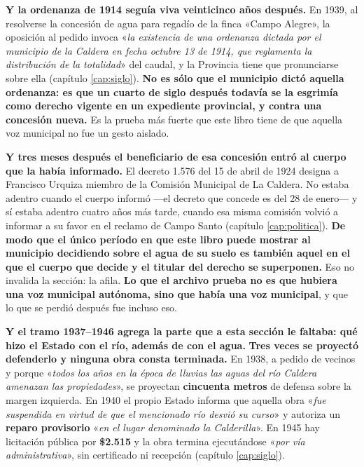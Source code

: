 \begin{cautela}
\textbf{Y la ordenanza de 1914 seguía viva veinticinco años después.} En 1939, al
resolverse la concesión de agua para regadío de la finca «Campo Alegre», la
oposición al pedido invoca «\textit{la existencia de una ordenanza dictada por el
municipio de la Caldera en fecha octubre 13 de 1914, que reglamenta la
distribución de la totalidad}» del caudal, y la Provincia tiene que pronunciarse
sobre ella (capítulo \ref{cap:siglo}). \textbf{No es sólo que el municipio
dictó aquella ordenanza: es que un cuarto de siglo después todavía se la
esgrimía como derecho vigente en un expediente provincial, y contra una
concesión nueva.} Es la prueba más fuerte que este libro tiene de que aquella
voz municipal no fue un gesto aislado.

\textbf{Y tres meses después el beneficiario de esa concesión entró al cuerpo que la había
informado.} El decreto 1.576 del 15 de abril de 1924 designa a Francisco Urquiza
miembro de la Comisión Municipal de La Caldera. No estaba adentro cuando el cuerpo informó ---el
decreto que concede es del 28 de enero--- y sí estaba adentro cuatro años más tarde, cuando esa
misma comisión volvió a informar a su favor en el reclamo de Campo Santo (capítulo
\ref{cap:politica}). \textbf{De modo que el único período en que este libro puede mostrar al
municipio decidiendo sobre el agua de su suelo es también aquel en el que el cuerpo que decide y
el titular del derecho se superponen.} Eso no invalida la sección: la afila. \textbf{Lo que el
archivo prueba no es que hubiera una voz municipal autónoma, sino que había una voz municipal}, y
que lo que se perdió después fue incluso eso.

\begin{cautela}
\textbf{Y el tramo 1937--1946 agrega la parte que a esta sección le faltaba: qué hizo el Estado
con el río, además de con el agua.} \textbf{Tres veces se proyectó defenderlo y ninguna obra
consta terminada.} En 1938, a pedido de vecinos y porque «\textit{todos los años en la época de
lluvias las aguas del río Caldera amenazan las propiedades}», se proyectan \textbf{cincuenta
metros} de defensa sobre la margen izquierda. En 1940 el propio Estado informa que aquella obra
«\textit{fue suspendida en virtud de que el mencionado río desvió su curso}» y autoriza un
\textbf{reparo provisorio} «\textit{en el lugar denominado la Calderilla}». En 1945 hay
licitación pública por \textbf{\$2.515} y la obra termina ejecutándose «\textit{por vía
administrativa}», sin certificado ni recepción (capítulo \ref{cap:siglo}).


\end{cautela}
\end{cautela}
